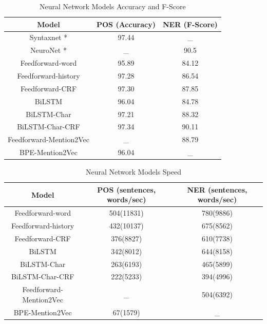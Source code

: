 \documentclass{sfuthesis}
\begin{document}
\begin{table}[]
\centering
\caption{Neural Network Models Accuracy and F-Score}
\label{table:my-label1}
\begin{tabular}{|c|c|c|}
\hline
Model         & POS (Accuracy)  & NER (F-Score)       \\ \hline
Syntaxnet \**    & 97.44         &   _     \\ \hline
NeuroNet \**    & _    & 90.5                \\ \hline 
Feedforward-word    & 95.89          &   84.12     \\ \hline
Feedforward-history & 97.28     & 86.54        \\ \hline
Feedforward-CRF     & 97.30          &   87.85     \\ \hline
BiLSTM  & 96.04     & 84.78                             \\ \hline
BiLSTM-Char & 97.21 & 88.32             \\ \hline
BiLSTM-Char-CRF & 97.34  & 90.11             \\ \hline
Feedforward-Mention2Vec  & _    & 88.79                       \\ \hline
BPE-Mention2Vec & 96.04     &  _   \\ \hline   
\end{tabular}
\end{table}

\begin{table}[]
\centering
\caption{Neural Network Models Speed}
\label{table:my-label2}
\begin{tabular}{|c|c|c|}
\hline
Model       & POS  (sentences, words/sec)  & NER  (sentences, words/sec)      \\ \hline
Feedforward-word    & 504(11831)     & 780(9886)    \\ \hline
Feedforward-history & 432(10137)     & 675(8562)     \\ \hline
Feedforward-CRF     & 376(8827)     & 610(7738)     \\ \hline
BiLSTM             & 342(8012)     & 644(8158)       \\ \hline
BiLSTM-Char        & 263(6193)  & 465(5899)             \\ \hline
BiLSTM-Char-CRF    & 222(5233)  & 394(4996)         \\ \hline
Feedforward-Mention2Vec         & _      & 504(6392)              \\ \hline
BPE-Mention2Vec     & 67(1579)  &  _               \\ \hline   
\end{tabular}
\end{table}
\end{document}
